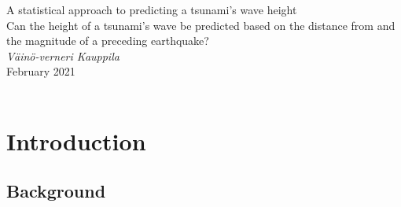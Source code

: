 \documentclass[11pt,letterpaper]{article}
\begin{document}



\begin{titlepage}
    \begin{center}
        \vspace*{4cm}
        A statistical approach to predicting a tsunami’s wave height \\
        \vspace{1cm}
        Can the height of a tsunami's wave be predicted based on the distance from and
        the magnitude of a preceding earthquake? \\
        \vspace{1cm}
        \textit{Väinö-verneri Kauppila} \\
        February 2021 \\
        \vspace{4cm}
         \\
        \vfill
        \vspace{0.1cm}
    \end{center}
\end{titlepage}



\begin{center}
    \tableofcontents
    \vspace{1in}

\end{center}



\newpage


\section{Introduction}

\subsection{Background}
\end{document}

